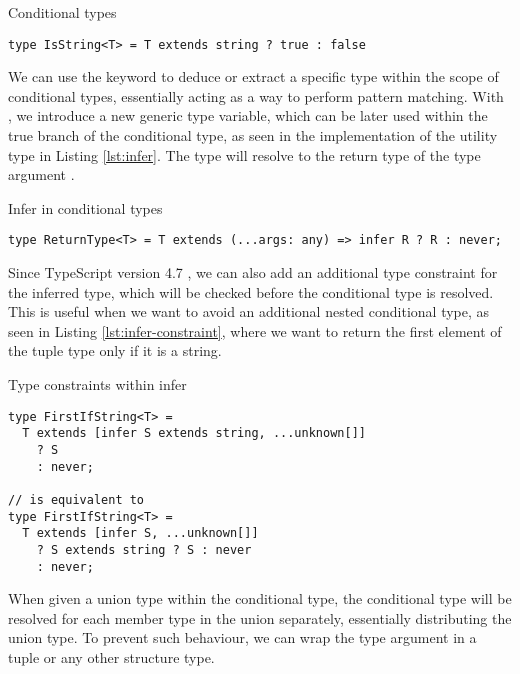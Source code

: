 \begin{listing}[ht]
  \caption{Conditional types}\label{lst:conditional-types}
  \begin{verbatim}
type IsString<T> = T extends string ? true : false
\end{verbatim}
\end{listing}

We can use the  keyword to deduce or extract a specific type within the scope of conditional types, essentially acting as a way to perform pattern matching. With , we introduce a new generic type variable, which can be later used within the true branch of the conditional type, as seen in the implementation of the  utility type in Listing \ref{lst:infer}. The  type will resolve to the return type of the type argument .

\begin{listing}[ht]
  \caption{Infer in conditional types}\label{lst:infer}
  \begin{verbatim}
type ReturnType<T> = T extends (...args: any) => infer R ? R : never;
\end{verbatim}
\end{listing}

Since TypeScript version 4.7 \cite{AnnouncingTypeScript4.7}, we can also add an additional type constraint for the inferred type, which will be checked before the conditional type is resolved. This is useful when we want to avoid an additional nested conditional type, as seen in Listing \ref{lst:infer-constraint}, where we want to return the first element of the tuple type only if it is a string.

\begin{listing}[ht]
  \caption{Type constraints within infer}\label{lst:infer-constraint}
  \begin{verbatim}
type FirstIfString<T> =
  T extends [infer S extends string, ...unknown[]]
    ? S
    : never;

// is equivalent to 
type FirstIfString<T> =
  T extends [infer S, ...unknown[]]
    ? S extends string ? S : never
    : never;
\end{verbatim}
\end{listing}

When given a union type within the conditional type, the conditional type will be resolved for each member type in the union separately, essentially distributing the union type. To prevent such behaviour, we can wrap the type argument in a tuple or any other structure type.


